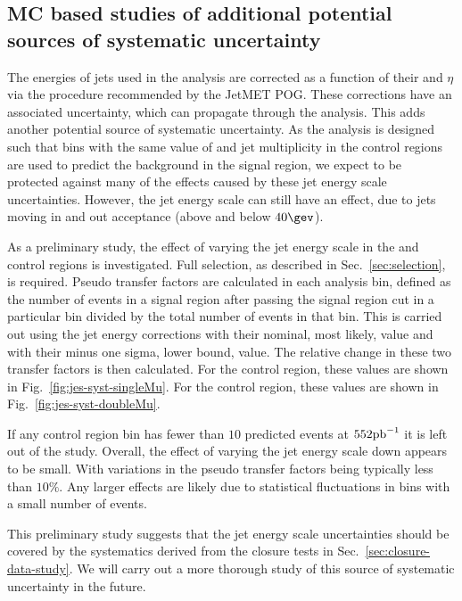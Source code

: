 \subsection{MC based studies of additional potential sources of
systematic uncertainty}
\label{sec:closure-tests-desc}



The energies of jets used in the analysis are corrected as a function of
their \pt and $\eta$ via the procedure recommended by
the JetMET POG. These corrections have an associated uncertainty,
which can propagate through the analysis. This adds another potential source 
of systematic uncertainty. As the analysis is designed such that bins
with the same value of \scalht and jet multiplicity in the control
regions are used to predict the background in the signal region, we
expect to be protected against many of the effects caused by these jet
energy scale uncertainties. However, the jet energy scale can still
have an effect, due to jets moving in and
out acceptance (above and below $40\gev$).

As a preliminary study, the effect of varying the jet
energy scale in the \mj and \mmj control regions is investigated. Full
selection, as described in Sec.~\ref{sec:selection}, is required.
Pseudo transfer factors are calculated in each analysis bin, defined
as the number of events in a signal region after passing the signal
region \alphat cut in a particular bin divided by the total number of
events in that bin. This is carried out using the jet energy
corrections with their nominal, most likely, value and with their
minus one sigma, lower bound, value. The relative change in these two
transfer factors is then calculated. For the \mj control region, these
values are shown in Fig.~\ref{fig:jes-syst-singleMu}. For the \mmj
control region, these values are shown in
Fig.~\ref{fig:jes-syst-doubleMu}. 

If any control region bin has fewer 
than $10$ predicted events at $552\ipb$ it is left out of the study.
Overall, the effect of varying the jet energy scale down appears to be
small. With variations in the pseudo transfer factors being typically
less than $10\%$. Any larger effects are likely due to statistical
fluctuations in bins with a small number of events.

This preliminary study suggests that the jet energy scale
uncertainties should be covered by the systematics derived from the
closure tests in Sec.~\ref{sec:closure-data-study}. We will carry out
a more thorough study of this source of systematic uncertainty in the
future.

